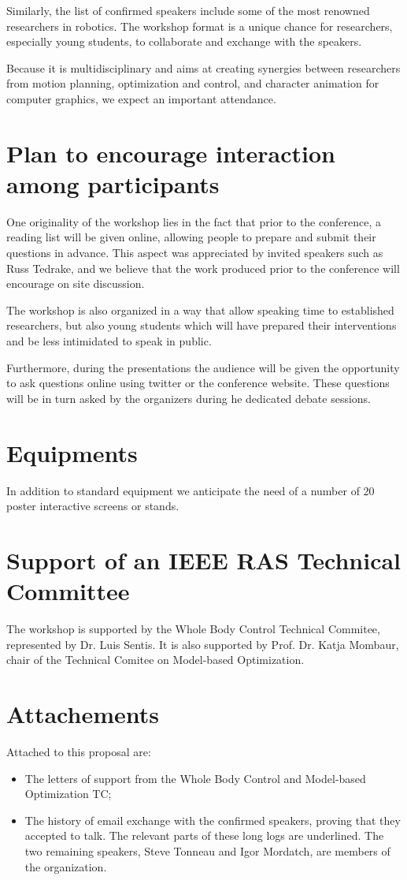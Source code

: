 \documentclass[12pt]{article}
\begin{document}
Similarly, the list of confirmed speakers include some of the most renowned researchers in robotics.
The workshop format is a unique chance for researchers, especially young students, to collaborate and exchange with the speakers.

Because it is multidisciplinary and aims at creating synergies between researchers from motion planning, optimization and control, and character animation for computer graphics, we expect an important attendance.

\section{Plan to encourage interaction among participants}
One originality of the workshop lies in the fact that prior to the conference, a reading list will be given online, allowing people to prepare and submit their questions in advance. This aspect was appreciated by invited speakers such as Russ Tedrake, and we believe that the work produced prior to the conference will encourage on site discussion.

The workshop is also organized in a way that allow speaking time to established researchers, but also young students which will have prepared their interventions and be less intimidated to speak in public.

Furthermore, during the presentations the audience will be given the opportunity to ask questions online using twitter or the conference website. These questions will be in turn asked by the organizers during he dedicated debate sessions.

\section{Equipments}
In addition to standard equipment we
anticipate the need of a number of 20 poster interactive screens
or stands.

\section{Support of an IEEE RAS Technical Committee}
The workshop is supported by the Whole Body Control Technical Commitee, represented by Dr. Luis Sentis.
It is also supported by Prof. Dr. Katja Mombaur, chair of the Technical Comitee on Model-based Optimization.

\section{Attachements}
Attached to this proposal are:
\begin{itemize}
\item The letters of support from the Whole Body Control and Model-based Optimization TC;
\item The history of email exchange with the confirmed speakers, proving that they accepted to talk.
The relevant parts of these long logs are underlined. The two remaining speakers, Steve Tonneau and Igor Mordatch,
are members of the organization.
\end{itemize}








\end{document}
